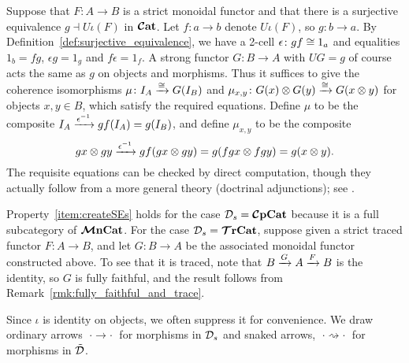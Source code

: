 \documentclass[11pt,oneside,article]{memoir}
\begin{document}
\begin{example}
  Suppose that $F\colon A\to B$ is a strict monoidal functor and that there is a surjective
  equivalence $g\dashv U\iota(F)$ in $\bm{\mathcal{C}}\mathbf{at}$. Let $f\colon a\to b$ denote $U\iota(F)$, so $g\colon
  b\to a$. By Definition~\ref{def:surjective_equivalence}, we have a 2-cell $\epsilon\colon gf\cong
  1_a$ and equalities $1_b=fg$, $\epsilon g=1_g$ and $f\epsilon=1_f$. A strong functor $G\colon B\to
  A$ with $UG=g$ of course acts the same as $g$ on objects and morphisms. Thus it suffices to give
  the coherence isomorphisms $\mu\colon I_A\xrightarrow{\cong}G(I_B)$ and $\mu_{x,y}\colon G(x)\otimes
  G(y)\xrightarrow{\cong} G(x\otimes y)$ for objects $x,y\in B$, which satisfy the required equations. Define
  $\mu$ to be the composite $I_A\xrightarrow{\epsilon^{-1}}gf(I_A)=g(I_B)$, and define $\mu_{x,y}$ to be the
  composite \[ gx\otimes gy\xrightarrow{\epsilon^{-1}}gf(gx\otimes gy)=g(fgx\otimes fgy)=g(x\otimes y). \]
  The requisite equations can be checked by direct computation, though they actually follow from a
  more general theory (doctrinal adjunctions); see \cite{Kelly}.

  Property~\ref{item:createSEs} holds for the case $\mathcal{D}_s=\bm{\mathcal{C}}\mathbf{pCat}$ because it is a full
  subcategory of $\bm{\mathcal{M}}\mathbf{nCat}$. For the case $\mathcal{D}_s=\bm{\mathcal{T}}\mathbf{rCat}$, suppose given a strict traced functor
  $F\colon A\to B$, and let $G\colon B\to A$ be the associated monoidal functor constructed above.
  To see that it is traced, note that $B\xrightarrow{G}A\xrightarrow{F}B$ is the identity, so $G$ is fully faithful,
  and the result follows from Remark~\ref{rmk:fully_faithful_and_trace}.
\end{example}

Since $\iota$ is identity on objects, we often suppress it for convenience. We draw ordinary arrows
$\;\cdot\to\cdot\;$ for morphisms in $\mathcal{D}_s$ and snaked arrows, $\;\cdot\rightsquigarrow\cdot\;$
for morphisms in $\tilde{\mathcal{D}}$.
\end{document}
